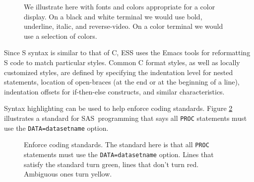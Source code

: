 \documentclass{article}
\newcommand*{\SAS}{\textsc{SAS}}
\newcommand{\stexttt}[1]{{\small\texttt{#1}}}
\begin{document}
\begin{figure}[tbp]%
  \caption{We illustrate here with fonts and colors appropriate for a
    color display.  On a black and white terminal we would use bold,
    underline, italic, and reverse-video.  On a color terminal we
    would use a selection of colors.}
  \label{f.font}
\end{figure}

Since S syntax is similar to that of C, ESS uses the Emacs tools for
reformatting S code to match particular styles.  Common C format styles,
as well as locally customized styles, are defined by specifying the indentation
level for nested statements, location of open-braces (at the end or at the
beginning of a line), indentation offsets for if-then-else constructs,
and similar characteristics.

Syntax highlighting can be used to help enforce coding
standards.  Figure \ref{f.hilock} illustrates a standard for
\SAS\ programming that says all \stexttt{PROC} statements must use the
\stexttt{DATA=datasetname} option.

\begin{figure}[tbp]
  \caption{Enforce coding standards.  The standard here is
    that all \stexttt{PROC} statements must use the
    \stexttt{DATA=datasetname} option.  Lines that satisfy the
    standard turn green, lines that don't turn red.
    Ambiguous ones turn yellow.}
  \label{f.hilock}
\end{figure}
\end{document}
